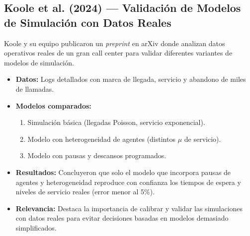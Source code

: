 \documentclass[12pt]{article}
\begin{document}
\subsection{Koole et al. (2024) — Validación de Modelos de Simulación con Datos Reales}
Koole y su equipo publicaron un \emph{preprint} en arXiv donde analizan datos operativos reales de un gran call center para validar diferentes variantes de modelos de simulación.  
\begin{itemize}
  \item \textbf{Datos:} Logs detallados con marca de llegada, servicio y abandono de miles de llamadas.  
  \item \textbf{Modelos comparados:} 
    \begin{enumerate}
      \item Simulación básica (llegadas Poisson, servicio exponencial).
      \item Modelo con heterogeneidad de agentes (distintos $\mu$ de servicio).
      \item Modelo con pausas y descansos programados.
    \end{enumerate}
  \item \textbf{Resultados:} Concluyeron que solo el modelo que incorpora pausas de agentes y heterogeneidad reproduce con confianza los tiempos de espera y niveles de servicio reales (error menor al 5\%).  
  \item \textbf{Relevancia:} Destaca la importancia de calibrar y validar las simulaciones con datos reales para evitar decisiones basadas en modelos demasiado simplificados.
\end{itemize}
\end{document}
